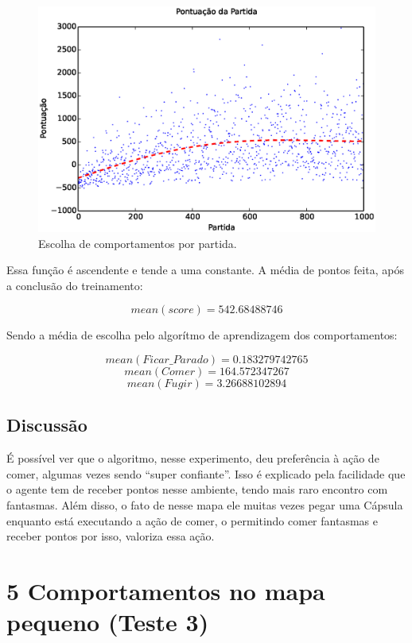 \begin{figure}[H]
    \centering
    \includegraphics[width=\linewidth]{images/3_behaviors_original_map/match_scores____pol}
    \caption{Escolha de comportamentos por partida.}
    \label{img:3ComportamentosMapaOriginal:PontuacaoPorPartida}
\end{figure}

Essa função é ascendente e tende a uma constante. A média de pontos feita, após a conclusão do treinamento:

$$ mean \left( score \right) = 542.68488746 $$

Sendo a média de escolha pelo algorítmo de aprendizagem dos comportamentos:

$$ mean \left( Ficar\_Parado \right) = 0.183279742765 $$
$$ mean \left( Comer \right) = 164.572347267 $$
$$ mean \left( Fugir \right) = 3.26688102894 $$


\subsection{Discussão}

É possível ver que o algoritmo, nesse experimento, deu preferência à ação de comer, algumas vezes sendo ``super confiante''. Isso é explicado pela facilidade que o agente tem de receber pontos nesse ambiente, tendo mais raro encontro com fantasmas. Além disso, o fato de nesse mapa ele muitas vezes pegar uma Cápsula enquanto está executando a ação de comer, o permitindo comer fantasmas e receber pontos por isso, valoriza essa ação.


\section{5 Comportamentos no mapa pequeno (Teste 3)}

